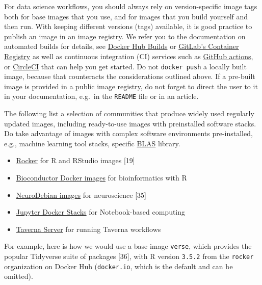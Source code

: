 \documentclass[10pt,letterpaper]{article}
\providecommand{\tightlist}{%
  \setlength{\itemsep}{0pt}\setlength{\parskip}{0pt}}
\begin{document}
For data science workflows, you should always rely on version-specific
image tags both for base images that you use, and for images that you
build yourself and then run. With keeping different versions (tags)
available, it is good practice to publish an image in an image registry.
We refer you to the documentation on automated builds for details, see
\href{https://docs.docker.com/docker-hub/builds/}{Docker Hub Builds} or
\href{https://docs.gitlab.com/ee/user/packages/container_registry/index.html\#build-and-push-images}{GitLab's
Container Registry} as well as continuous integration (CI) services such
as
\href{https://github.com/actions/starter-workflows/tree/master/ci}{GitHub
actions}, or
\href{https://circleci.com/orbs/registry/orb/circleci/docker\#commands-build}{CircleCI}
that can help you get started. Do not \texttt{docker\ push} a locally
built image, because that counteracts the considerations outlined above.
If a pre-built image is provided in a public image registry, do not
forget to direct the user to it in your documentation, e.g.~in the
\texttt{README} file or in an article.

The following list a selection of communities that produce widely used
regularly updated images, including ready-to-use images with
preinstalled software stacks. Do take advantage of images with complex
software environments pre-installed, e.g., machine learning tool stacks,
specific
\href{https://en.wikipedia.org/wiki/Basic_Linear_Algebra_Subprograms}{BLAS}
library.

\begin{itemize}
\tightlist
\item
  \href{https://www.rocker-project.org/}{Rocker} for R and RStudio
  images {[}19{]}
\item
  \href{https://bioconductor.org/help/docker/}{Bioconductor Docker
  images} for bioinformatics with R
\item
  \href{https://hub.docker.com/_/neurodebian}{NeuroDebian images} for
  neuroscience {[}35{]}
\item
  \href{https://jupyter-docker-stacks.readthedocs.io/en/latest/index.html}{Jupyter
  Docker Stacks} for Notebook-based computing
\item
  \href{https://hub.docker.com/r/taverna/taverna-server}{Taverna Server}
  for running Taverna workflows
\end{itemize}

For example, here is how we would use a base image \texttt{verse}, which
provides the popular Tidyverse suite of packages {[}36{]}, with R
version \texttt{3.5.2} from the \texttt{rocker} organization on Docker
Hub (\texttt{docker.io}, which is the default and can be omitted).
\end{document}
